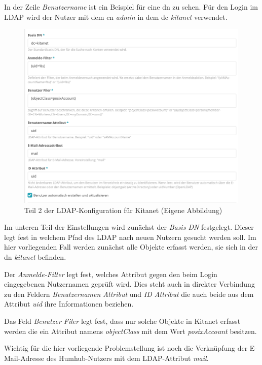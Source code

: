 In der Zeile \textit{Benutzername} ist ein Beispiel für eine \ac{dn} zu sehen. Für den Login im LDAP wird der Nutzer mit dem \ac{cn} \textit{admin} in dem \ac{dc} \textit{kitanet} verwendet.

\begin{figure}[h]
  \centering
  \includegraphics[width=1.0\textwidth]{res/ldapkitanet2.png}
  \caption{Teil 2 der LDAP-Konfiguration für Kitanet (Eigene Abbildung)}
  \label{fig:LDAP Kitanet Teil 2}
\end{figure}

Im unteren Teil der Einstellungen wird zunächst der \textit{Basis DN} festgelegt. Dieser legt fest in welchem Pfad des LDAP nach neuen Nutzern gesucht werden soll. Im hier vorliegenden Fall werden zunächst alle Objekte erfasst werden, sie sich in der \ac{dn} \textit{kitanet} befinden.

Der \textit{Anmelde-Filter} legt fest, welches Attribut gegen den beim Login eingegebenen Nutzernamen geprüft wird. Dies steht auch in direkter Verbindung zu den Feldern \textit{Benutzernamen Attribut} und \textit{ID Attribut} die auch beide aus dem Attribut \textit{uid} ihre Informationen beziehen. 

Das Feld \textit{Benutzer Filer} legt fest, dass nur solche Objekte in Kitanet erfasst werden die ein Attribut namens \textit{objectClass} mit dem Wert \textit{posixAccount} besitzen.

Wichtig für die hier vorliegende Problemstellung ist noch die Verknüpfung der E-Mail-Adresse des Humhub-Nutzers mit dem LDAP-Attribut \textit{mail}. 

